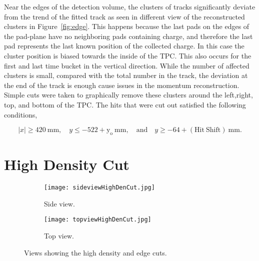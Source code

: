 Near the edges of the detection volume, the clusters of tracks significantly deviate from the trend of the fitted track as seen in different view of the reconstructed clusters in Figure~\ref{fig:edge}.  This happens because the last pads on the edges of the pad-plane have no neighboring pads containing charge, and therefore the last pad represents the last known position of the collected charge. In this case the cluster position is biased towards the inside of the TPC. This also occurs for the first and last time bucket in the vertical direction. While the number of affected clusters is small, compared with the total number in the track, the deviation at the end of the track is enough cause issues in the momentum reconstruction. Simple cuts were taken to graphically remove these clusters around the left,right, top, and bottom of the TPC. The hits that were cut out satisfied the following conditions, 

\begin{equation*}
  |x|\geq420~\mathrm{mm},\quad y\leq-522+\mathrm{y_o}~\mathrm{mm},
  \quad\mathrm{and}\quad y\geq-64+\mathrm{(Hit\ Shift)}~\mathrm{mm}.
\label{eq:hitshift}
\end{equation*}



\section{High Density Cut}


\begin{figure}[!htb]

     \centering
     \begin{subfigure}[b]{0.49\textwidth}
         \centering
         \texttt{[image: sideviewHighDenCut.jpg]}
         \caption{Side view.}
         \label{fig:sideHigh}
     \end{subfigure}
     \hfill
     \begin{subfigure}[b]{0.49\textwidth}
         \centering
         \texttt{[image: topviewHighDenCut.jpg]}
         \caption{Top view.}
         \label{fig:topHigh}
     \end{subfigure}
        \label{fig:highcut}
        \caption{Views showing the high density and edge cuts.}
        \label{fig:elipsecut}
\end{figure}

